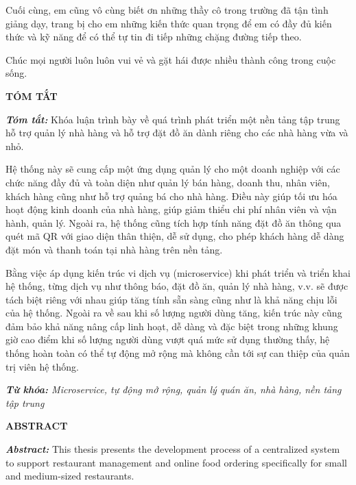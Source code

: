 Cuối cùng, em cũng vô cùng biết ơn những thầy cô trong trường đã tận tình giảng dạy, trang bị cho em những kiến thức quan trọng để em có đầy đủ kiến thức và kỹ năng để có thể tự tin đi tiếp những chặng đường tiếp theo.

Chúc mọi người luôn luôn vui vẻ và gặt hái được nhiều thành công trong cuộc sống.

\newpage
{}
\begin{center}
    \textbf{TÓM TẮT}
\end{center}
\changefontsizes[16pt]{12pt}
\textit{\textbf{Tóm tắt: }} 
Khóa luận trình bày về quá trình phát triển một nền tảng tập trung hỗ trợ quản lý nhà hàng và hỗ trợ đặt đồ ăn dành riêng cho các nhà hàng vừa và nhỏ.

Hệ thống này sẽ cung cấp một ứng dụng quản lý cho một doanh nghiệp với các chức năng đầy đủ và toàn diện như quản lý bán hàng, doanh thu, nhân viên, khách hàng cũng như hỗ trợ quảng bá cho nhà hàng.
Điều này giúp tối ưu hóa hoạt động kinh doanh của nhà hàng, giúp giảm thiểu chi phí nhân viên và vận hành, quản lý.
Ngoài ra, hệ thống cũng tích hợp tính năng đặt đồ ăn thông qua quét mã QR với giao diện thân thiện, dễ sử dụng, cho phép khách hàng dễ dàng đặt món và thanh toán tại nhà hàng trên nền tảng.

Bằng việc áp dụng kiến trúc vi dịch vụ (microservice) khi phát triển và triển khai hệ thống, từng dịch vụ như thông báo, đặt đồ ăn, quản lý nhà hàng, v.v. sẽ được tách biệt riêng với nhau giúp tăng tính sẵn sàng cũng như là khả năng chịu lỗi của hệ thống.
Ngoài ra về sau khi số lượng người dùng tăng, kiến trúc này cũng đảm bảo khả năng nâng cấp linh hoạt, dễ dàng và đặc biệt trong những khung giờ cao điểm khi số lượng người dùng vượt quá mức sử dụng thường thấy, hệ thống hoàn toàn có thể tự động mở rộng mà không cần tới sự can thiệp của quản trị viên hệ thống.
\vspace{-0.5cm}
\begin{flushleft}
  \textit{\textbf{Từ khóa: } Microservice, tự động mở rộng, quản lý quán ăn, nhà hàng, nền tảng tập trung}
\end{flushleft}

\newpage
{}
\begin{center}
    \textbf{ABSTRACT}
\end{center}
\changefontsizes[16pt]{12pt}
\textit{\textbf{Abstract: }} 
This thesis presents the development process of a centralized system to support restaurant management and online food ordering specifically for small and medium-sized restaurants.

